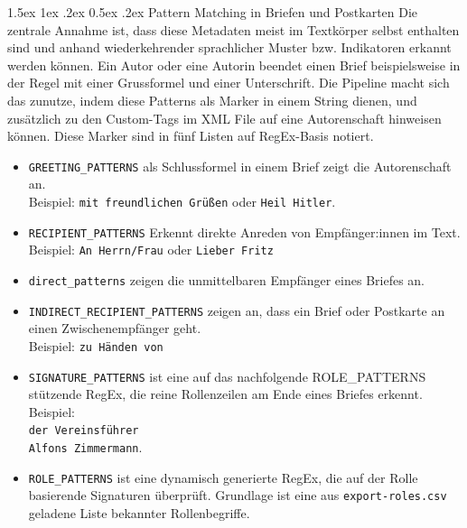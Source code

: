 \documentclass[12pt, a4paper, ngerman, bidi=default]{article}
\makeatletter
\newcommand{\code}[1]{\colorbox{VeryLightGray}{\texttt{#1}}} %
\let\oldparagraph\paragraph%
\renewcommand{\paragraph}{
    \@ifstar%
      \xxxParagraphStar%
      \xxxParagraphNoStar%
 }
\newcommand{\xxxParagraphStar}[1]{\oldparagraph*{#1}\mbox{}}
\newcommand{\xxxParagraphNoStar}[1]{\oldparagraph{#1}\mbox{}}
\renewcommand\paragraph{\@startsection{paragraph}{4}{0em}%
  {1.5ex \@plus1ex \@minus.2ex}%
  {0.5ex \@plus.2ex}%
  {\normalfont\normalsize\bfseries\itshape}}
\makeatother
\begin{document}
\paragraph{Pattern Matching in Briefen und Postkarten}
Die zentrale Annahme ist, dass diese Metadaten meist im Textkörper selbst enthalten sind und anhand wiederkehrender sprachlicher Muster bzw. Indikatoren erkannt werden können. Ein Autor oder eine Autorin beendet einen Brief beispielsweise in der Regel mit einer Grussformel und einer Unterschrift. Die Pipeline macht sich das zunutze, indem diese Patterns als Marker in einem String dienen, und zusätzlich zu den Custom-Tags im XML File auf eine Autorenschaft hinweisen können. Diese Marker sind in fünf Listen auf RegEx-Basis notiert.
\begin{itemize}
    \item \code{GREETING\_PATTERNS} als Schlussformel in einem Brief zeigt die Autorenschaft an. \\Beispiel: \texttt{mit freundlichen Grüßen} oder \texttt{Heil Hitler}.
    \item \code{RECIPIENT\_PATTERNS} Erkennt direkte Anreden von Empfänger:innen im Text. \\Beispiel: \texttt{An Herrn/Frau} oder \texttt{Lieber Fritz}
    \item \code{direct\_patterns} zeigen die unmittelbaren Empfänger eines Briefes an.
    \item \code{INDIRECT\_RECIPIENT\_PATTERNS} zeigen an, dass ein Brief oder Postkarte an einen Zwischenempfänger geht. \\Beispiel: \texttt{zu Händen von}
    \item \code{SIGNATURE\_PATTERNS} ist eine auf das nachfolgende ROLE\_PATTERNS stützende RegEx, die reine Rollenzeilen am Ende eines Briefes erkennt. Beispiel:\\
    \texttt{der Vereinsführer\\Alfons Zimmermann}. \\ 
    \item \code{ROLE\_PATTERNS} ist eine dynamisch generierte RegEx, die auf der Rolle basierende Signaturen überprüft. Grundlage ist eine aus \code{export-roles.csv} geladene Liste bekannter Rollenbegriffe.
\end{itemize}
\end{document}
